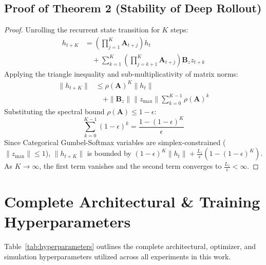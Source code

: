 \subsection{Proof of Theorem 2 (Stability of Deep Rollout)}
\begin{proof}
Unrolling the recurrent state transition for $K$ steps:
\begin{equation}
\begin{split}
    h_{t+K} &= \left(\prod_{j=1}^K \mathbf{A}_{t+j}\right) h_t \\
    &\quad + \sum_{k=1}^K \left(\prod_{j=k+1}^K \mathbf{A}_{t+j}\right) \mathbf{B}_z z_{t+k}
\end{split}
\end{equation}
Applying the triangle inequality and sub-multiplicativity of matrix norms:
\begin{equation}
\begin{split}
    \|h_{t+K}\| &\le \rho(\mathbf{A})^K \|h_t\| \\
    &\quad + \|\mathbf{B}_z\| \|z_{\mathrm{max}}\| \sum_{k=0}^{K-1} \rho(\mathbf{A})^k
\end{split}
\end{equation}
Substituting the spectral bound $\rho(\mathbf{A}) \le 1 - \epsilon$:
\begin{equation}
    \sum_{k=0}^{K-1} (1 - \epsilon)^k = \frac{1 - (1 - \epsilon)^K}{\epsilon}
\end{equation}
Since Categorical Gumbel-Softmax variables are simplex-constrained ($\|z_{\mathrm{max}}\| \le 1$), $\|h_{t+K}\|$ is bounded by $(1 - \epsilon)^K \|h_t\| + \frac{L_z}{\epsilon} (1 - (1 - \epsilon)^K)$. As $K \rightarrow \infty$, the first term vanishes and the second term converges to $\frac{L_z}{\epsilon} < \infty$.
\end{proof}

\section{Complete Architectural \& Training Hyperparameters}
\label{app:hyperparams}

Table~\ref{tab:hyperparameters} outlines the complete architectural, optimizer, and simulation hyperparameters utilized across all experiments in this work.

